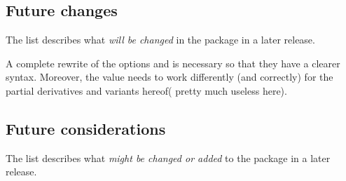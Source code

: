 \documentclass[final,british,10pt]{scrartcl}
\theoremstyle{remark}
\begin{document}
\subsection{Future changes}
The list describes what \emph{will be changed} in the package in a later release.
\begin{revision}
	\item A complete rewrite of the options  and  is necessary so that they have a clearer syntax. Moreover, the value  needs to work differently (and correctly) for the partial derivatives and variants hereof( pretty much useless here). \label{revis:add_remove}
\end{revision}

\subsection{Future considerations}
The list describes what \emph{might be changed or added} to the package in a later release.
\end{document}
